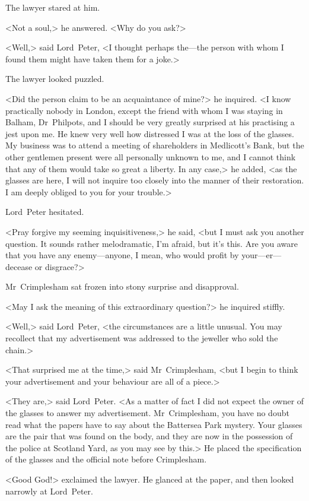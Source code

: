 The lawyer stared at him.

<Not a soul,> he answered. <Why do you ask?>

<Well,> said Lord~Peter, <I thought perhaps the—the person with whom I found them might have taken them for a joke.>

The lawyer looked puzzled.

<Did the person claim to be an acquaintance of mine?> he inquired. <I know practically nobody in London, except the friend with whom I was staying in Balham, Dr~Philpots, and I should be very greatly surprised at his practising a jest upon me. He knew very well how distressed I was at the loss of the glasses. My business was to attend a meeting of shareholders in Medlicott's Bank, but the other gentlemen present were all personally unknown to me, and I cannot think that any of them would take so great a liberty. In any case,> he added, <as the glasses are here, I will not inquire too closely into the manner of their restoration. I am deeply obliged to you for your trouble.>

Lord~Peter hesitated.

<Pray forgive my seeming inquisitiveness,> he said, <but I must ask you another question. It sounds rather melodramatic, I'm afraid, but it's this. Are you aware that you have any enemy—anyone, I mean, who would profit by your—er—decease or disgrace?>

Mr~Crimplesham sat frozen into stony surprise and disapproval.

<May I ask the meaning of this extraordinary question?> he inquired stiffly.

<Well,> said Lord~Peter, <the circumstances are a little unusual. You may recollect that my advertisement was addressed to the jeweller who sold the chain.>

<That surprised me at the time,> said Mr~Crimplesham, <but I begin to think your advertisement and your behaviour are all of a piece.>

<They are,> said Lord~Peter. <As a matter of fact I did not expect the owner of the glasses to answer my advertisement. Mr~Crimplesham, you have no doubt read what the papers have to say about the Battersea Park mystery. Your glasses are the pair that was found on the body, and they are now in the possession of the police at Scotland Yard, as you may see by this.> He placed the specification of the glasses and the official note before Crimplesham.

<Good God!> exclaimed the lawyer. He glanced at the paper, and then looked narrowly at Lord~Peter.

